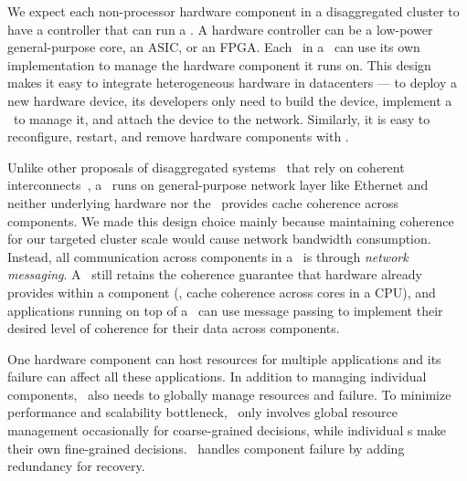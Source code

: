 \documentclass[10pt,times,twocolumn]{z2-article}
\begin{document}
We expect each non-processor hardware component in a disaggregated cluster to have a controller that 
can run a \microos.
A hardware controller can be a low-power general-purpose core, an ASIC, or an FPGA.
Each \microos\ in a \splitkernel\ can use its own implementation to manage the hardware component it runs on.
This design makes it easy to integrate heterogeneous hardware in datacenters ---
to deploy a new hardware device, its developers only need to build the device,
implement a \microos\ to manage it, %
and attach the device to the network. 
Similarly, it is easy to reconfigure, restart, and remove hardware components with \splitkernel.

Unlike other proposals of disaggregated systems~\cite{HP-TheMachine} that rely on coherent interconnects~\cite{GenZ,ccix,OpenCAPI},
a \splitkernel\ runs on general-purpose network layer like Ethernet and 
neither underlying hardware nor the \splitkernel\ provides cache coherence across components.
We made this design choice mainly because maintaining coherence for our targeted cluster scale 
would cause network bandwidth consumption.
Instead, all communication across components in a \splitkernel\ is through {\em network messaging}.
A \splitkernel\ still retains the coherence guarantee that hardware already provides within a component (\eg, cache coherence across cores in a CPU),
and applications running on top of a \splitkernel\ can use message passing to implement their desired level of coherence for their data across components.

One hardware component can host resources for multiple applications and its failure can affect all these applications.
In addition to managing individual components, \splitkernel\ also needs to 
globally manage resources and failure.
To minimize performance and scalability bottleneck,
\splitkernel\ only involves global resource management occasionally for coarse-grained decisions, 
while individual \microos{}s make their own fine-grained decisions.
\splitkernel\ handles component failure by adding redundancy for recovery.
\end{document}
